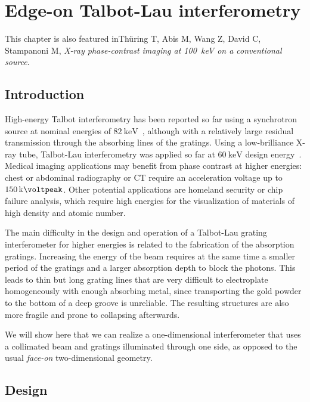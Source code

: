 \chapter{Edge-on Talbot-Lau interferometry}\label{ch:edgeon} %
This chapter is also featured in\cn Th\"uring T, Abis M, Wang Z, David C,
Stampanoni M, \emph{X-ray phase-contrast imaging at \SI{100}{\kilo\eV} on a
conventional source}.

\section{Introduction}
High-energy Talbot interferometry has been reported so far using a
synchrotron source at nominal energies of
$\SI{82}{\kilo\electronvolt}$~\parencite{Willner2013}, although with a relatively
large residual transmission through the absorbing lines of the gratings.
Using a low-brilliance X-ray tube, Talbot-Lau interferometry was applied so
far at $\SI{60}{\kilo\electronvolt}$ design energy~\parencite{Donath2009a}.
Medical imaging applications may benefit from phase contrast at higher
energies: chest or abdominal radiography or \ac{CT} require an acceleration
voltage up to $\SI{150}{\kilo\voltpeak}$. Other potential
applications are homeland security or chip failure analysis, which require
high energies for the visualization of materials of high density and atomic
number.

The main difficulty in the design and operation of a Talbot-Lau grating
interferometer for higher energies is related to the fabrication of the
absorption gratings. Increasing the energy of the beam requires at the same
time a smaller period of the gratings and a larger absorption depth to block
the photons. This leads to thin but long grating lines that are very
difficult to electroplate homogeneously with enough absorbing metal, since
transporting the gold powder to the bottom of a deep groove is unreliable\cn.
The resulting structures are also more fragile and prone to collapsing
afterwards\cn.

We will show here that we can realize a one-dimensional interferometer that
uses a collimated beam and gratings illuminated through one side, as opposed
to the usual \emph{face-on} two-dimensional geometry.

\section{Design}
